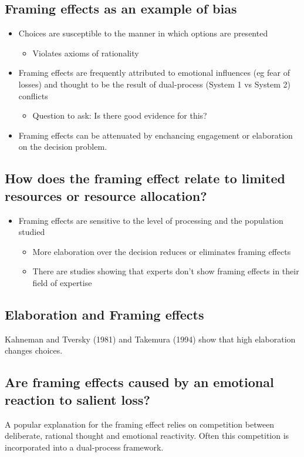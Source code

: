\subsection{Framing effects as an example of bias}
\begin{itemize}
    \item Choices are susceptible to the manner in which options are presented
    \begin{itemize}
        \item Violates axioms of rationality
    \end{itemize}
    \item Framing effects are frequently attributed to emotional influences (eg fear of losses) and thought to be the result of dual-process (System 1 vs System 2) conflicts
    \begin{itemize}
        \item Question to ask: Is there good evidence for this?
    \end{itemize}
    \item Framing effects can be attenuated by enchancing engagement or elaboration on the decision problem.
\end{itemize}
\subsection{How does the framing effect relate to limited resources or resource allocation?}
\begin{itemize}
    \item Framing effects are sensitive to the level of processing and the population studied
    \begin{itemize}
        \item More elaboration over the decision reduces or eliminates framing effects
        \item There are studies showing that experts don't show framing effects in their field of expertise
    \end{itemize}
\end{itemize}
\subsection{Elaboration and Framing effects}
Kahneman and Tversky (1981) and Takemura (1994) show that high elaboration changes choices.
\subsection{Are framing effects caused by an emotional reaction to salient loss?}
A popular explanation for the framing effect relies on competition between deliberate, rational thought and emotional reactivity. Often this competition is incorporated into a dual-process framework.
